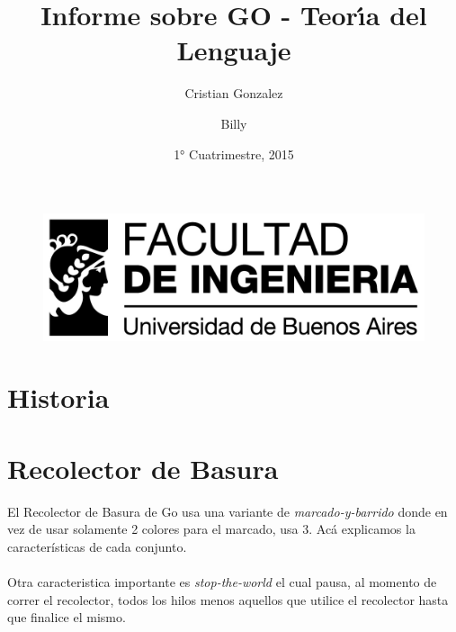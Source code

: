 \documentclass{article}
\begin{document}
\begin{figure}
\centering
\includegraphics[width=0.9\linewidth]{./logo_fiuba_alta}
\label{fig:logo_fiuba_alta}
\end{figure}

\title{Informe sobre GO - Teor\'{\i}a del Lenguaje}
\author{Cristian Gonzalez \and Billy}
\date{1° Cuatrimestre, 2015}
\maketitle
\section{Historia}
\section{Recolector de Basura}
El Recolector de Basura de Go usa una variante de \textit{marcado-y-barrido} donde en vez de usar solamente 2 colores para el marcado, usa 3. 
Ac\'{a} explicamos la características de cada conjunto.
\\
\\


Otra caracteristica importante es \textit{stop-the-world} el cual pausa, al momento de correr el recolector, todos los hilos menos aquellos que utilice el recolector hasta que finalice el mismo. 
\end{document}
